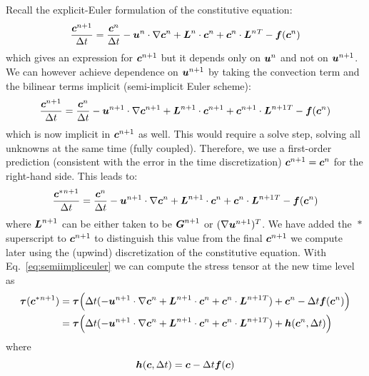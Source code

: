 Recall the explicit-Euler formulation of the constitutive equation:
\begin{equation}
 \frac{\boldsymbol{c}^{n+1}}{\Delta t} = \frac{\boldsymbol{c}^{n}}{\Delta t}
-\boldsymbol{u}^n\cdot\nabla\boldsymbol{c}^n+\boldsymbol{L}^n\cdot\boldsymbol{c}^n+\boldsymbol{c}^n\cdot\boldsymbol{L}^n{}^T
 -\boldsymbol{f}(\boldsymbol{c}^n)
\end{equation}
which gives an expression for $\boldsymbol{c}^{n+1}$ but it depends only on $\boldsymbol{u}^n$
and not on $\boldsymbol{u}^{n+1}$. We can however achieve dependence on
$\boldsymbol{u}^{n+1}$ by taking the convection term and the bilinear terms implicit
(semi-implicit Euler scheme):
\begin{equation}
 \frac{\boldsymbol{c}^{n+1}}{\Delta t} = \frac{\boldsymbol{c}^{n}}{\Delta t}
-\boldsymbol{u}^{n+1}\cdot\nabla\boldsymbol{c}^{n+1}+\boldsymbol{L}^{n+1}\cdot\boldsymbol{c}^{n+1}+
   \boldsymbol{c}^{n+1}\cdot\boldsymbol{L}^{n+1}{}^T -\boldsymbol{f}(\boldsymbol{c}^n)
\end{equation}
which is now implicit in $\boldsymbol{c}^{n+1}$ as well. This would require a solve
step, solving all unknowns at the same time (fully coupled). Therefore, we use
a first-order prediction (consistent with the error in the time discretization)
$\boldsymbol{c}^{n+1}=\boldsymbol{c}^{n}$ for the right-hand side. This leads to:
\begin{equation}
 \frac{\boldsymbol{c}^*{}^{n+1}}{\Delta t} = \frac{\boldsymbol{c}^{n}}{\Delta t}
-\boldsymbol{u}^{n+1}\cdot\nabla\boldsymbol{c}^n+\boldsymbol{L}^{n+1}\cdot\boldsymbol{c}^n+\boldsymbol{c}^n\cdot\boldsymbol{L}^{n+1}{}^T
 -\boldsymbol{f}(\boldsymbol{c}^n)
 \label{eq:semiimpliceuler}
\end{equation}
where $\boldsymbol{L}^{n+1}$ can be either taken to be $\boldsymbol{G}^{n+1}$ or 
$(\nabla\boldsymbol{u}^{n+1})^T$. We have added the $^{}*$ superscript to $\boldsymbol{c}^{n+1}$ to distinguish this value from the final $\boldsymbol{c}^{n+1}$ we compute
later using the (upwind) discretization of the constitutive equation.
With Eq.~\eqref{eq:semiimpliceuler} we can compute the stress tensor at the new time level as
\begin{equation}
  \begin{split}
   \boldsymbol{\tau}(\boldsymbol{c}^*{}^{n+1})&=
 \boldsymbol{\tau}\Big(\Delta t(-\boldsymbol{u}^{n+1}\cdot\nabla\boldsymbol{c}^n+
           \boldsymbol{L}^{n+1}\cdot\boldsymbol{c}^n+\boldsymbol{c}^n\cdot\boldsymbol{L}^{n+1}{}^T)
+\boldsymbol{c}^{n}-\Delta t\boldsymbol{f}(\boldsymbol{c}^n)\Big)\\
 &=\boldsymbol{\tau}\Big(\Delta t(-\boldsymbol{u}^{n+1}\cdot\nabla\boldsymbol{c}^n+
                  \boldsymbol{L}^{n+1}\cdot\boldsymbol{c}^n+\boldsymbol{c}^n\cdot\boldsymbol{L}^{n+1}{}^T)
+\boldsymbol{h}(\boldsymbol{c}^n,\Delta t)\Big)
  \end{split}
\end{equation}
where 
\begin{equation}
 \boldsymbol{h}(\boldsymbol{c}, \Delta t)= \boldsymbol{c}-\Delta t\boldsymbol{f}(\boldsymbol{c})
\end{equation}
